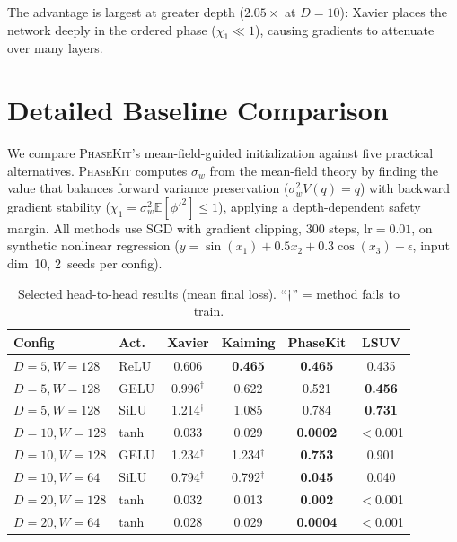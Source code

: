 \documentclass[10pt]{article}
\newcommand{\EE}{\mathbb{E}}
\newcommand{\ToolName}{\textsc{PhaseKit}}
\begin{document}
The advantage is largest at greater depth ($2.05\times$ at $D=10$): Xavier places the network deeply in the ordered phase ($\chi_1 \ll 1$), causing gradients to attenuate over many layers.

\section{Detailed Baseline Comparison}
\label{app:baseline-detail}

We compare \ToolName{}'s mean-field-guided initialization against five practical alternatives.
\ToolName{} computes $\sigma_w$ from the mean-field theory by finding the value that balances forward variance preservation ($\sigma_w^2 V(q) = q$) with backward gradient stability ($\chi_1 = \sigma_w^2 \EE[\phi'^2] \leq 1$), applying a depth-dependent safety margin.
All methods use SGD with gradient clipping, 300 steps, lr$=0.01$, on synthetic nonlinear regression ($y = \sin(x_1) + 0.5x_2 + 0.3\cos(x_3) + \epsilon$, input dim~10, 2~seeds per config).

\begin{table}[h]
\centering
\caption{Selected head-to-head results (mean final loss). ``$\dagger$'' = method fails to train.}
\label{tab:baseline-comparison-full}
\small
\begin{tabular}{@{}llcccc@{}}
\toprule
\textbf{Config} & \textbf{Act.} & \textbf{Xavier} & \textbf{Kaiming} & \textbf{PhaseKit} & \textbf{LSUV} \\
\midrule
$D\!=\!5, W\!=\!128$  & ReLU & 0.606 & \textbf{0.465} & \textbf{0.465} & 0.435 \\
$D\!=\!5, W\!=\!128$  & GELU & 0.996$^\dagger$ & 0.622 & 0.521 & \textbf{0.456} \\
$D\!=\!5, W\!=\!128$  & SiLU & 1.214$^\dagger$ & 1.085 & 0.784 & \textbf{0.731} \\
\midrule
$D\!=\!10, W\!=\!128$ & tanh & 0.033 & 0.029 & \textbf{0.0002} & $<$0.001 \\
$D\!=\!10, W\!=\!128$ & GELU & 1.234$^\dagger$ & 1.234$^\dagger$ & \textbf{0.753} & 0.901 \\
$D\!=\!10, W\!=\!64$  & SiLU & 0.794$^\dagger$ & 0.792$^\dagger$ & \textbf{0.045} & 0.040 \\
\midrule
$D\!=\!20, W\!=\!128$ & tanh & 0.032 & 0.013 & \textbf{0.002} & $<$0.001 \\
$D\!=\!20, W\!=\!64$  & tanh & 0.028 & 0.029 & \textbf{0.0004} & $<$0.001 \\
\bottomrule
\end{tabular}
\end{table}
\end{document}
